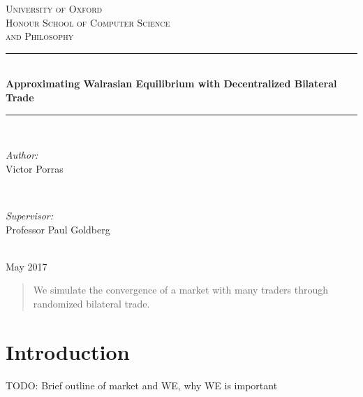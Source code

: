 \documentclass[12pt,a4paper,titlepage]{article}
\begin{document}
\begin{titlepage}

\newcommand{\HRule}{\rule{\linewidth}{0.5mm}} %

\center %
 
\textsc{\LARGE University of Oxford}\\[1.5cm] %
\textsc{\LARGE Honour School of Computer Science \\[0.2cm] and Philosophy}\\[0.5cm] %

\HRule \\[0.4cm]
{ \LARGE \bfseries Approximating Walrasian Equilibrium with Decentralized Bilateral Trade}\\[0.4cm] %
\HRule \\[2cm]
 
\begin{minipage}{0.45\textwidth}
\begin{flushleft} \Large
\emph{Author:}\\
Victor Porras %
\end{flushleft}
\end{minipage}
~
\begin{minipage}{0.45\textwidth}
\begin{flushright} \Large
\emph{Supervisor:} \\
Professor Paul Goldberg %
\end{flushright}
\end{minipage}\\[2cm]

{\Large {May 2017}}\\[2cm]

 

\vfill %

\end{titlepage}

\begin{abstract}
  We simulate the convergence of a market with many traders through randomized bilateral trade.
\end{abstract}

\section{Introduction}
TODO: Brief outline of market and WE, why WE is important
\end{document}
